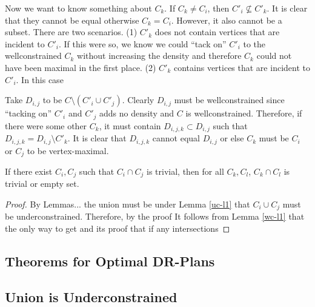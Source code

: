 \documentclass[11pt]{article}
\begin{document}
Now we want to know something about $C_k$. If $C_k \neq C_i$, then $C'_i\not\subseteq C'_k$. It is clear that they cannot be equal otherwise $C_k = C_i$. However, it also cannot be a subset. There are two scenarios. (1) $C'_k$ does not contain vertices that are incident to $C'_i$. If this were so, we know we could ``tack on'' $C'_i$ to the wellconstrained $C_k$ without increasing the density and therefore $C_k$ could not have been maximal in the first place. (2) $C'_k$ contains vertices that are incident to $C'_i$. In this case

Take $D_{i,j}$ to be $C\setminus (C'_i\cup C'_j)$. Clearly $D_{i,j}$ must be wellconstrained since ``tacking on'' $C'_i$ and $C'_j$ adds no density and $C$ is wellconstrained. Therefore, if there were some other $C_k$, it must contain $D_{i,j,k}\subset D_{i,j}$ such that $D_{i,j,k}=D_{i,j}\setminus C'_k$. It is clear that $D_{i,j,k}$ cannot equal $D_{i,j}$ or else $C_k$ must be $C_i$ or $C_j$ to be vertex-maximal.


\begin{lemma}
If there exist $C_i, C_j$ such that $C_i\cap C_j$ is trivial, then for all $C_k,C_l$, $C_k\cap C_l$ is trivial or empty set.
\end{lemma}

\begin{proof}
By Lemmas... the union must be under
Lemma \ref{uc-l1} that $C_i\cup C_j$ must be underconstrained. Therefore, by the proof
It follows from Lemma \ref{wc-l1} that the only way to get
 and its proof that if any intersections
\end{proof}





\subsection{Theorems for Optimal DR-Plans}


\subsection{Union is Underconstrained}
\end{document}
